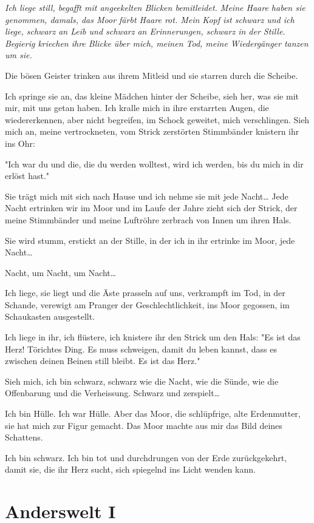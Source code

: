 {\em Ich liege still, begafft  mit angeekelten Blicken bemitleidet. Meine Haare haben sie genommen, damals, das Moor färbt Haare rot.
Mein Kopf ist schwarz und ich liege, schwarz an Leib und schwarz an Erinnerungen, schwarz in der Stille. Begierig kriechen ihre Blicke über mich, meinen Tod, meine Wiedergänger tanzen um sie.

Die bösen Geister trinken aus ihrem Mitleid und sie starren durch die Scheibe.

Ich springe sie an, das kleine Mädchen hinter der Scheibe, sieh her, was sie mit mir, mit uns getan haben. Ich kralle mich in ihre erstarrten Augen, die wiedererkennen, aber nicht begreifen, im Schock geweitet, mich verschlingen. Sieh mich an, meine vertrockneten, vom Strick zerstörten Stimmbänder knistern ihr ins Ohr:

"Ich war du und die, die du werden wolltest, wird ich werden, bis du mich in dir erlöst hast."

Sie trägt mich mit sich nach Hause und ich nehme sie mit jede Nacht\dots
Jede Nacht ertrinken wir im Moor und im Laufe der Jahre zieht sich der Strick, der meine Stimmbänder und meine Luftröhre zerbrach von Innen um ihren Hals.

Sie wird stumm, erstickt an der Stille, in der ich in ihr ertrinke im Moor, jede Nacht\dots

Nacht, um Nacht, um Nacht\dots

Ich liege, sie liegt und die Äste prasseln auf uns, verkrampft im Tod, in der Schande, verewigt am Pranger der Geschlechtlichkeit, ins Moor gegossen, im Schaukasten ausgestellt.

Ich liege in ihr, ich flüstere, ich knistere ihr den Strick um den Hals:
"Es ist das Herz! Törichtes Ding. Es muss schweigen, damit du leben kannst, dass es zwischen deinen Beinen still bleibt. Es ist das Herz."

Sieh mich, ich bin schwarz, schwarz wie die Nacht, wie die Sünde, wie die Offenbarung und die Verheissung. Schwarz und zerspielt\dots

Ich bin Hülle. Ich war Hülle. Aber das Moor, die schlüpfrige, alte Erdenmutter, sie hat mich zur Figur gemacht. Das Moor machte aus mir das Bild deines Schattens.

Ich bin schwarz. Ich bin tot und durchdrungen von der Erde zurückgekehrt, damit sie, die ihr Herz sucht, sich spiegelnd ins Licht wenden kann.}


\section*{Anderswelt I}



